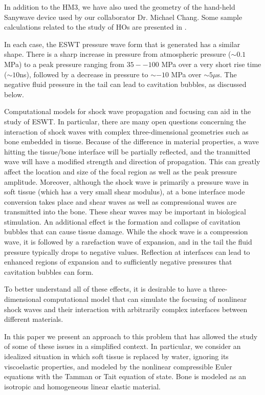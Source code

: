 In addition to the HM3, we have also used the geometry of the
hand-held Sanywave device used by our collaborator Dr. Michael Chang.
Some sample calculations related to the study of HOs are presented in
.

In each case, the ESWT pressure wave form
that is generated has a similar shape. There is a sharp increase
in pressure from atmospheric pressure ($\sim0.1$MPa)
to a peak  pressure ranging from $35--100$
MPa over a very short rise time ($\sim10$ns), 
followed by a decrease in pressure to $\sim-10$
MPa over $\sim5 \mu$s. The negative fluid pressure in the tail can lead to
cavitation bubbles, as discussed below.


Computational models for shock wave propagation and focusing can
aid in the study of ESWT.  In particular, there are many open
questions concerning the interaction of shock waves with complex
three-dimensional geometries such as bone embedded in tissue.
Because of the difference in material properties, a wave hitting
the tissue/bone interface will be partially reflected, and the
tranmitted wave will have a modified strength and direction of
propagation.  This can greatly affect the location and size of the
focal region as well as the peak pressure amplitude.  Moreover,
although the shock wave is primarily a pressure wave in soft tissue
(which has a very small shear modulus), at a bone interface 
mode conversion takes place and shear waves as well as compressional
waves are transmitted into the bone.  These shear waves may be
important in biological stimulation.  An additional effect is the
formation and collapse of cavitation bubbles that can cause tissue
damage.  While the shock wave is a compression wave, it is followed
by a rarefaction wave of expansion, and in the tail the fluid
pressure typically drops to negative values.  Reflection at interfaces
can lead to enhanced regions of expansion and to sufficiently
negative pressures that cavitation bubbles can form.

To better understand all of these effects, it is desirable to have a
three-dimensional computational model that can simulate the focusing of
nonlinear shock waves and their interaction with arbitrarily complex
interfaces between different materials.  

In this paper we present an approach to this problem that has allowed
the study of some of these issues in a simplified context.  In
particular, we consider an idealized situation in which soft tissue
is replaced by water, ignoring its viscoelastic properties, and
modeled by the nonlinear compressible Euler equations with the
Tamman or Tait equation of state.  Bone is modeled as an isotropic
and homogeneous linear elastic material.

